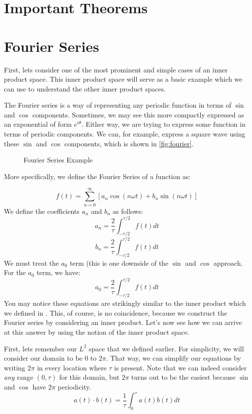 \section{Important Theorems}



\section{Fourier Series}
First, lets consider one of the most prominent and simple cases of an inner product space. This inner product space will serve as a basic example which we can use to understand the other inner product spaces.

The Fourier series is a way of representing any periodic function in terms of $\sin$ and $\cos$ components. Sometimes, we may see this more compactly expressed as an exponential of form $e^{i\theta}$. Either way, we are trying to express some function in terms of periodic components. We can, for example, express a square wave using these $\sin$ and $\cos$ components, which is shown in \autoref{fig:fourier}.

\begin{figure}
    \centering
    
    \caption{Fourier Series Example}
    \label{fig:fourier}
\end{figure}

More specifically, we define the Fourier Series of a function as:

$$f(t)=\sum_{n=0}^\infty\left[a_n\cos(n\omega t) + b_n\sin(n\omega t)\right]$$
We define the coefficients $a_n$ and $b_n$ as follows:
$$a_n=\frac{2}{\tau}\int_{-\tau/2}^{\tau/2}f(t)dt$$
$$b_n=\frac{2}{\tau}\int_{-\tau/2}^{\tau/2}f(t)dt$$
We must treat the $a_0$ term (this is one downside of the $\sin$ and $\cos$ approach. For the $a_0$ term, we have:
$$a_0=\frac{2}{\tau}\int_{-\tau/2}^{\tau/2}f(t)dt$$
You may notice these equations are strikingly similar to the inner product which we defined in . This, of course, is no coincidence, because we construct the Fourier series by considering an inner product. Let's now see how we can arrive at this answer by using the notion of the inner product space.

First, lets remember our $L^2$ space that we defined earlier. For simplicity, we will consider our domain to be $0$ to $2\pi$. That way, we can simplify our equations by writing $2\pi$ in every location where $\tau$ is present. Note that we can indeed consider \textit{any} range $(0,\tau)$ for this domain, but $2\pi$ turns out to be the easiest because $\sin$ and $\cos$ have $2\pi$ periodicity. 
$$a(t)\cdot b(t)=\frac{1}{\tau}\int_0^\tau{a(t)\overline{b(t)}}dt$$

